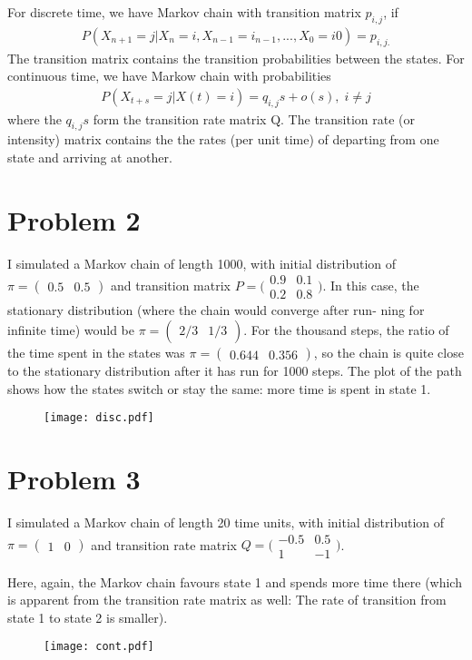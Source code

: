 \documentclass[a4paper]{article}
\begin{document}
\begin{enumerate}[a.]
For discrete time, we have Markov chain with transition matrix $p_{i,j}$, if
\begin{align}
P(X_{n+1}= j| X_{n}= i,X_{n-1}= i_{n-1},...,X_{0}= i0) = p_{i,j.}
\end{align}
The transition matrix contains the transition probabilities between the states.
For continuous time, we have Markow chain with probabilities
\begin{align}
P(X_{t+s}= j| X(t) = i) = q_{i,j}s + o(s),\;i\neq j
\end{align}
where the $q_{i,j}s$ form the transition rate matrix Q. The transition rate (or
intensity) matrix contains the the rates (per unit time) of departing from one
state and arriving at another.
\end{enumerate}
\clearpage
\section*{Problem 2}
I simulated a Markov chain of length 1000, with initial distribution of
$\pi = (\begin{smallmatrix} 0.5 & 0.5\end{smallmatrix})$ and transition matrix  $P = \bigl(\begin{smallmatrix} 0.9 &
0.1 \\ 0.2 & 0.8\end{smallmatrix}\bigr)$.
In this case, the stationary distribution (where the chain would converge after run-
ning for infinite time) would be $\pi = (\begin{smallmatrix} 2/3 & 1/3 \end{smallmatrix})$. For the thousand steps, the ratio of
the time spent in the states was $\pi = (\begin{smallmatrix}  0.644 & 0.356 \end{smallmatrix})$, so the chain is quite close to the
stationary distribution after it has run for 1000 steps. The plot of the path
shows how the states switch or stay the same: more time is spent in state 1.
\begin{figure}[ht]
    \centering
    \texttt{[image: disc.pdf]}
\end{figure}
\clearpage
\section*{Problem 3}
I simulated a Markov chain of length 20 time units, with initial distribution of
$\pi = (\begin{smallmatrix} 1 & 0\end{smallmatrix})$ and transition rate matrix 
$Q = \bigl(\begin{smallmatrix} -0.5 & 0.5 \\ 1 & -1\end{smallmatrix}\bigr)$.

Here, again, the Markov chain favours state 1 and spends more time there (which
is apparent from the transition rate matrix as well: The rate of transition
from state 1 to state 2 is
smaller).
\begin{figure}[ht]
    \centering
    \texttt{[image: cont.pdf]}
\end{figure}
\end{document}
